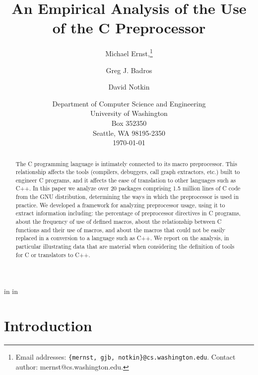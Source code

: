 
\marginparwidth 0pt
\oddsidemargin  0pt
\evensidemargin 0pt
\marginparsep 0pt

\topmargin   0pt

 in
 in




\title{An Empirical Analysis of the Use of the C Preprocessor}

\author{Michael Ernst,\thanks{Email 
addresses: {\tt \{mernst, gjb, notkin\}@cs.washington.edu}.  Contact author:
mernst@cs.washington.edu.}
\and Greg J. Badros \and David Notkin}


\date{Department of Computer
Science and Engineering
\\University 
of Washington\\
Box 352350\\
Seattle, WA  98195-2350\\
\today}  

\maketitle


\begin{abstract}

The C programming language is intimately connected to its macro
preprocessor.  This relationship affects the tools (compilers,
debuggers, call graph extractors, etc.) built to engineer C programs,
and it affects the ease of translation to other languages such as C++.
In this paper we analyze over 20 packages comprising 1.5 million lines
of C code from the GNU distribution, determining the ways in which the
preprocessor is used in practice.  We developed a framework for
analyzing preprocessor usage, using it to extract information
including: the percentage of preprocessor directives in C programs,
about the frequency of use of defined macros, about the relationship
between C functions and their use of macros, and about the macros that
could not be easily replaced in a conversion to a language such as
C++.  We report on the analysis, in particular illustrating data that
are material when considering the definition of tools for C or
translators to C++.  

\end{abstract}

\bigskip

\section{Introduction}

